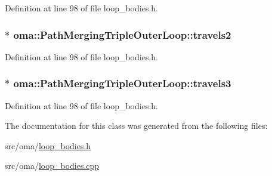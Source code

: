 Definition at line 98 of file loop\-\_\-bodies.\-h.

\hypertarget{classoma_1_1_path_merging_triple_outer_loop_a5df3c60b5e2bae045e6e91bf5bbaa26f}{
\subsubsection[{travels2}]{ $\ast$ oma\-::\-Path\-Merging\-Triple\-Outer\-Loop\-::travels2\hspace{0.3cm}{\ttfamily [protected]}}}\label{classoma_1_1_path_merging_triple_outer_loop_a5df3c60b5e2bae045e6e91bf5bbaa26f}


Definition at line 98 of file loop\-\_\-bodies.\-h.

\hypertarget{classoma_1_1_path_merging_triple_outer_loop_a0c7c5e666337c432267d668172bc2e1b}{
\subsubsection[{travels3}]{ $\ast$ oma\-::\-Path\-Merging\-Triple\-Outer\-Loop\-::travels3\hspace{0.3cm}{\ttfamily [protected]}}}\label{classoma_1_1_path_merging_triple_outer_loop_a0c7c5e666337c432267d668172bc2e1b}


Definition at line 98 of file loop\-\_\-bodies.\-h.



The documentation for this class was generated from the following files\-:\begin{DoxyCompactItemize}
\item 
src/oma/\hyperlink{loop__bodies_8h}{loop\-\_\-bodies.\-h}\item 
src/oma/\hyperlink{loop__bodies_8cpp}{loop\-\_\-bodies.\-cpp}\end{DoxyCompactItemize}
